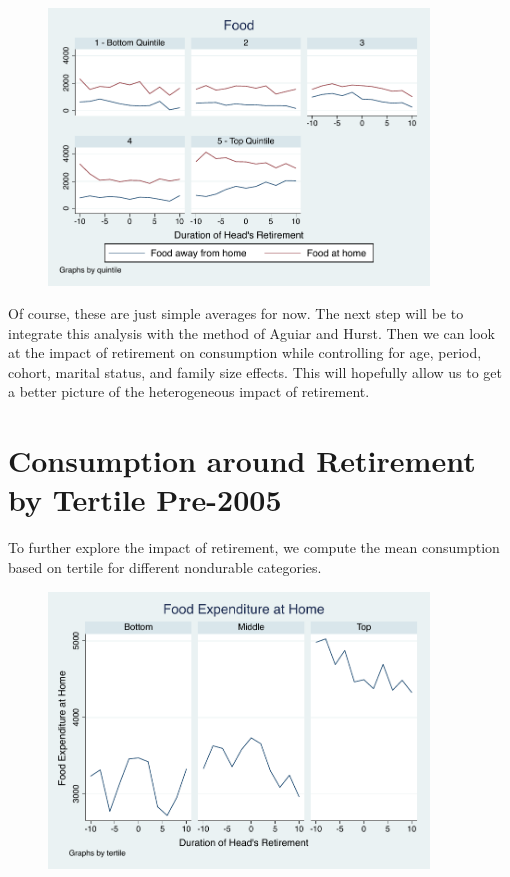 \documentclass[11pt]{article}
\begin{document}
\begin{figure}[h]
	\centering
	\includegraphics[width=0.9\textwidth]{../ConsumptionPostRetirement/food.pdf}
\end{figure}


Of course, these are just simple averages for now. The next step will be to integrate this analysis with the method of Aguiar and Hurst. Then we can look at the impact of retirement on consumption while controlling for age, period, cohort, marital status, and family size effects. This will hopefully allow us to get a better picture of the heterogeneous impact of retirement.

\section{Consumption around Retirement by Tertile Pre-2005}

To further explore the impact  of retirement, we compute the mean consumption based on tertile for different nondurable categories. 

\begin{figure}[h]
	\centering
	\includegraphics[width=0.9\textwidth]{../ConsumptionPostRetirement/Tertile_1/total_foodexp_home_real.pdf}
\end{figure}
\end{document}

